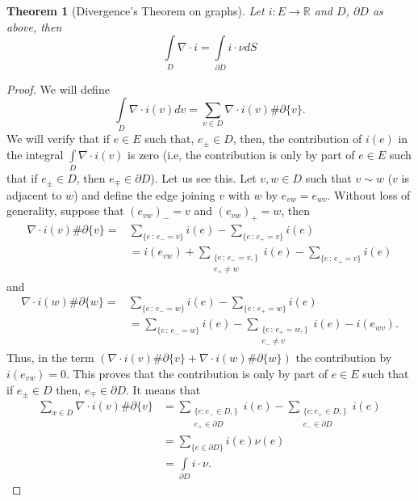 \documentclass{article}
\newtheorem{theorem}{Theorem}
\begin{document}
\begin{theorem}[Divergence's Theorem on graphs] 
	Let $i: E\rightarrow \mathbb{R}$ and $D$, $\partial D$ as above, then
	\[
	   \int \limits_{D}\nabla\cdot i=\int \limits_{\partial D}i\cdot \nu dS
	\]
\end{theorem}
\begin{proof}
	 We will define
	\[
	  \int \limits_{D}\nabla\cdot i(v)dv=\sum \limits_{v\in D}\nabla\cdot i(v)\#\partial \{v\}.
	\]
	We will verify that if $e\in E$ such that, $e_{\pm}\in D$, then, the contribution of $i(e)$ in the integral $\int \limits_{D}\nabla\cdot i(v)$ is zero (i.e, the contribution is only by part of $e\in E$ such that if $e_{\pm}\in D$, then $e_{\mp}\in \partial D$). Let us see this. Let $v,w\in D$ such that $v\sim w$ ($v$ is adjacent to $w$) and define the edge joining $v$ with $w$ by $e_{vw}=e_{wv}$. Without loss of generality, suppose that $(e_{vw})_-=v$ and $(e_{vw})_+=w$, then 
	\begin{align*}
	 \nabla\cdot i(v)\#\partial \{v\}= & \sum \limits_{\{e\,:\,e_-=v\}}i(e)-\sum \limits_{\{e\,:\,e_+=v\}}i(e)\\
	 & = i(e_{vw})+\sum_{\substack{\{e\,:\, e_-=v,\}\\ e_+\neq w}}i(e)-\sum \limits_{\{e\,:\,e_+=v\}}i(e)
	\end{align*}
	and
	\begin{align*}
	   \nabla\cdot i(w)\#\partial \{w\}= & \sum \limits_{\{e\,:\,e_-=w\}}i(e)-\sum \limits_{\{e\,:\,e_+=w\}}i(e)\\
	  & =\sum \limits_{\{e\,:\,e_-=w\}}i(e)-\sum_{\substack{\{e\,:\, e_+=w,\}\\ e_-\neq v}}i(e)-i(e_{wv}).
	\end{align*}
	Thus, in the term  $(\nabla\cdot i(v)\#\partial \{v\}+\nabla\cdot i(w)\#\partial \{w\})$ the contribution by $i(e_{vw})=0$. This proves that the contribution is only by part of $e\in E$ such that if $e_{\pm}\in D$ then, $e_{\mp}\in \partial D$. It means that
	\begin{align*}
	\sum \limits_{x\in D}\nabla\cdot i(v)\#\partial \{v\} & =\sum_{\substack{\{e:e_-\in D,\}\\e_+\in \partial D}}i(e)-\sum_{\substack{\{e:e_+\in D,\}\\e_-\in \partial D}}i(e)\\
	&=\sum \limits_{\{e\in \partial D\}}i(e)\nu(e)\\
	&=\int  \limits_{\partial D}i\cdot \nu. 
	\end{align*}
\end{proof}
\end{document}
